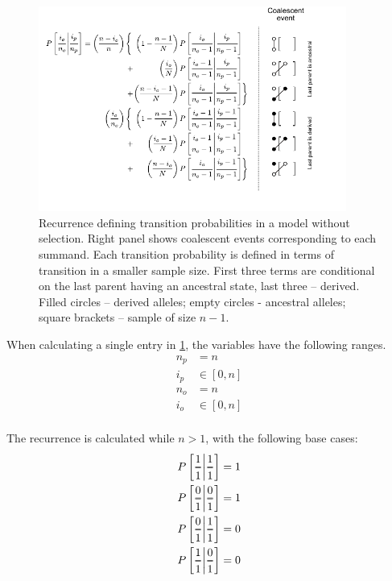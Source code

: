 \documentclass[review]{elsarticle}
\newcommand{\Dfrac}[2]{%
  \ooalign{%
    $\genfrac{}{}{1.2pt}0{#1}{#2}$\cr%
    $\color{white}\genfrac{}{}{.4pt}0{\phantom{#1}}{\phantom{#2}}$}%
}
\newcommand{\cond}{\middle\vert}
\begin{document}
\begin{figure}
  \centering
  \includegraphics[width=0.9\textwidth]{fig/recurrence-neutral-annotated.pdf}
  \caption{Recurrence defining transition probabilities in a model without selection. Right panel
    shows coalescent events corresponding to each summand. Each transition probability is defined in
    terms of transition in a smaller sample size. First three terms are conditional on the last
    parent having an ancestral state, last three -- derived. Filled circles -- derived alleles;
    empty circles - ancestral alleles; square brackets -- sample of size $n-1$.}
  \label{fig:rec-neutral}
\end{figure}

When calculating a single entry in \ref{fig:rec-neutral}, the variables have the following ranges.
\begin{equation}
  \begin{aligned}
    n_p &= n \\
    i_p &\in [0, n] \\
    n_o &= n \\
    i_o &\in [0, n] \\
  \end{aligned}
\end{equation}

The recurrence is calculated while $n>1$, with the following base cases:
\begin{align*}
  P\left[ \Dfrac{1}{1} \cond \Dfrac{1}{1} \right] &= 1 \\
  P\left[ \Dfrac{0}{1} \cond \Dfrac{0}{1} \right] &= 1 \\
  P\left[ \Dfrac{0}{1} \cond \Dfrac{1}{1} \right] &= 0 \\
  P\left[ \Dfrac{1}{1} \cond \Dfrac{0}{1} \right] &= 0 \\
\end{align*}
\end{document}
